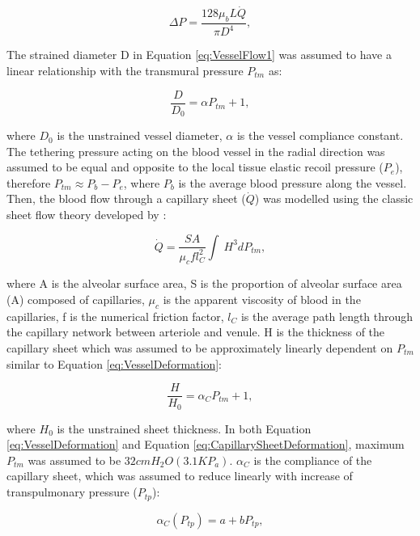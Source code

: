\begin{equation}
 \label{eq:VesselFlow1}
 \Delta P = \frac{128 \mu_bL\dot{Q}}{\pi D^{4}},
\end{equation}

The strained diameter D in Equation \ref{eq:VesselFlow1} was assumed to have a linear relationship with the transmural pressure $P_{tm}$ as:

\begin{equation}
 \label{eq:VesselDeformation}
 \frac{D}{D_0} = \alpha P_{tm} + 1,
\end{equation}

\noindent where $D_0$ is the unstrained vessel diameter, $\alpha$ is the vessel compliance constant. The tethering pressure acting on the blood vessel in the radial direction was assumed to be equal and opposite to the local tissue elastic recoil pressure ($P_e$), therefore $P_{tm} \approx P_b - P_e$, where $P_b$ is the average blood pressure along the vessel. Then, the blood flow through a capillary sheet ($\dot{Q}$) was modelled using the classic sheet flow theory developed by \cite{fung1969theory}:

\begin{equation}
 \label{eq:CapillarySheetFlow}
 \dot{Q} = \frac{SA}{\mu_c f l^{2}_{C}} \int\ H^{3}dP_{tm},
\end{equation}

\noindent where A is the alveolar surface area, S is the proportion of alveolar surface area (A) composed of capillaries, $\mu_c$ is the apparent viscosity of blood in the capillaries, f is the numerical friction factor, $l_C$ is the average path length through the capillary network between arteriole and venule. H is the thickness of the capillary sheet which was assumed to be approximately linearly dependent on $P_{tm}$ similar to Equation \ref{eq:VesselDeformation}:

\begin{equation}
 \label{eq:CapillarySheetDeformation}
 \frac{H}{H_0} = \alpha_C P_{tm} + 1,
\end{equation}

\noindent where $H_0$ is the unstrained sheet thickness. In both Equation \ref{eq:VesselDeformation} and Equation \ref{eq:CapillarySheetDeformation}, maximum $P_{tm}$ was assumed to be $32 cmH_2 O(3.1KP_a)$. $\alpha_C$ is the compliance of the capillary sheet, which was assumed to reduce linearly with increase of transpulmonary pressure ($P_{tp}$):

\begin{equation} 
 \label{eq:CapillaryCompliance}
 \alpha_C(P_{tp}) = a + bP_{tp},
\end{equation}

